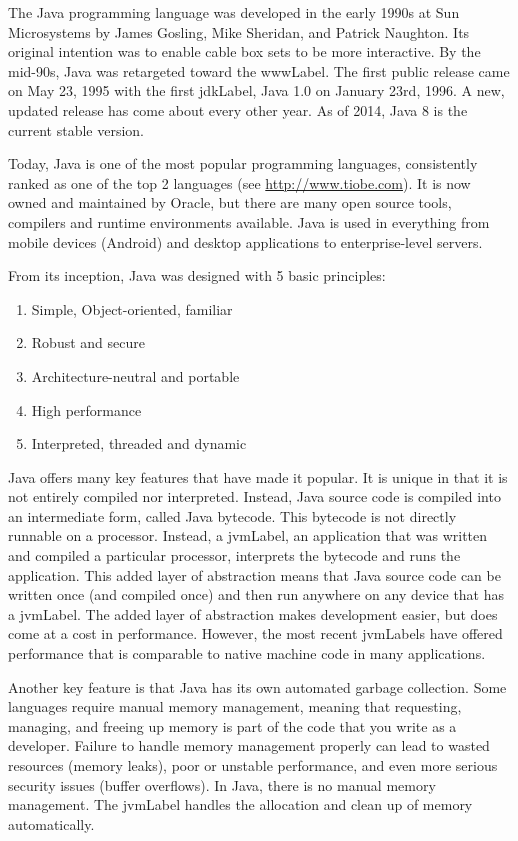 

The Java programming language was developed in the early 1990s at
Sun Microsystems by James Gosling, Mike Sheridan, and Patrick 
Naughton.  Its original intention was to enable cable box sets to
be more interactive.  By the mid-90s, Java was retargeted toward 
the \gls{wwwLabel}.  The first public release came on May 23, 1995
with the first \gls{jdkLabel}, Java 1.0 on January 23rd, 1996.  A 
new, updated release has come about every other year.  As of 2014, 
Java 8 is the current stable version. 

Today, Java is one of the most popular programming languages, consistently
ranked as one of the top 2 languages (see \url{http://www.tiobe.com}).  It
is now owned and maintained by Oracle, but there are many open
source tools, compilers and runtime environments available.  Java is
used in everything from mobile devices (Android) and desktop applications 
to enterprise-level servers.  

From its inception, Java was designed with 5 basic principles:
\begin{enumerate}
  \item Simple, Object-oriented, familiar
  \item Robust and secure
  \item Architecture-neutral and portable
  \item High performance
  \item Interpreted, threaded and dynamic
\end{enumerate}

Java offers many key features that have made it popular.  It is unique
in that it is not entirely compiled nor interpreted.  Instead, Java source
code is compiled into an intermediate form, called Java bytecode.  
This bytecode is not directly runnable on a processor.  Instead, a
\gls{jvmLabel}, an application that was written and compiled a 
particular processor, interprets the bytecode and runs the application.
This added layer of abstraction means that Java source code can
be written once (and compiled once) and then run anywhere on 
any device that has a \gls{jvmLabel}.  The added layer of abstraction
makes development easier, but does come at a cost in performance.
However, the most recent \glspl{jvmLabel} have offered performance
that is comparable to native machine code in many applications.

Another key feature is that Java has its own automated \gls{garbage 
collection}.  Some languages require manual memory management, 
meaning that requesting, managing, and freeing up memory is part
of the code that you write as a developer.  Failure to handle memory
management properly can lead to wasted resources (memory leaks), 
poor or unstable performance, and even more serious security issues 
(buffer overflows).  In Java, there is no manual memory management.
The \gls{jvmLabel} handles the allocation and clean up of memory automatically.

